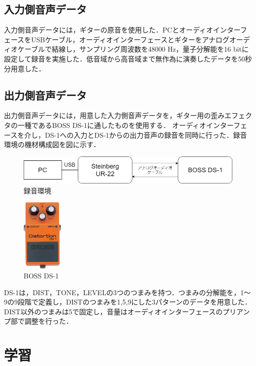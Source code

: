 \documentclass{jreport}		%
\begin{document}
\subsection{入力側音声データ}
入力側音声データには，ギターの原音を使用した．PCとオーディオインターフェースをUSBケーブル，オーディオインターフェースとギターをアナログオーディオケーブルで結線し，サンプリング周波数を48000 Hz，量子分解能を16 bitに設定して録音を実施した．低音域から高音域まで無作為に演奏したデータを50秒分用意した．

\subsection{出力側音声データ}
出力側音声データには，用意した入力側音声データを，ギター用の歪みエフェクタの一種であるBOSS DS-1に通したものを使用する．
オーディオインターフェースを介し，DS-1への入力とDS-1からの出力音声の録音を同時に行った．録音環境の機材構成図を図に示す．

\begin{figure}[htbp]
 \begin{center}
  \includegraphics[width=120mm]{env.png}
 \end{center}
 \caption{録音環境}
 \label{fig:one}
\end{figure}

\begin{figure}[htbp]
 \begin{center}
  \includegraphics[width=20mm]{ds1.jpg}
 \end{center}
 \caption{BOSS DS-1}
 \label{fig:one}
\end{figure}

DS-1は，DIST，TONE，LEVELの3つのつまみを持つ．つまみの分解能を，1～9の9段階で定義し，DISTのつまみを1,5,9にした3パターンのデータを用意した．DIST以外のつまみは5で固定し，音量はオーディオインターフェースのプリアンプ部で調整を行った．

\section{学習}
\end{document}
